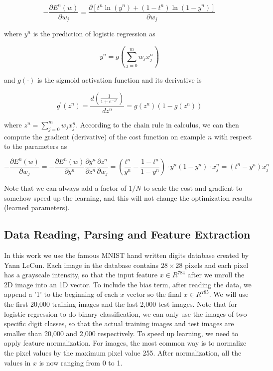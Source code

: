 \documentclass{article} %
\begin{document}
\begin{equation}
	-\frac{\partial E^{n}(w)}{\partial w_{j}} = \frac{\partial [t^{n}\ln(y^{n})+(1-t^{n})\ln(1-y^{n})]}{\partial w_{j}} 
\end{equation}

where $y^{n}$ is the prediction of logistic regression as

\begin{equation}
	y^{n} = g(\sum_{j=0}^{m}w_{j}x_{j}^{n})
\end{equation}

and $g(\cdot)$ is the sigmoid activation function and its derivative is

\begin{equation}
	g^{\prime}(z^{n}) = \frac{d(\frac{1}{1+e^{-z^{n}}})}{dz^{n}} = g(z^{n})(1-g(z^{n}))
\end{equation}

where $z ^{n}= \sum_{j=0}^{m}w_{j}x_{j}^{n}$. According to the chain rule in calculus, we can then compute the gradient (derivative) of the cost function on example $n$ with respect to the parameters as

\begin{equation}
	-\frac{\partial E^{n}(w)}{\partial w_{j}} = -\frac{\partial E^{n}(w)}{\partial y^{n}}\frac{\partial y^{n}}{\partial z^{n}}\frac{\partial z^{n}}{\partial w_{j}} = (\frac{t^{n}}{y^{n}}-\frac{1-t^{n}}{1-y^{n}})\cdot y^{n}(1-y^{n})\cdot x_{j}^{n} = (t^{n}-y^{n})x_{j}^{n}
\end{equation}

Note that we can always add a factor of $1/N$ to scale the cost and gradient to somehow speed up the learning, and this will not change the optimization results (learned parameters).

\subsection{Data Reading, Parsing and Feature Extraction} 
In this work we use the famous MNIST hand written digits database created by Yann LeCun. Each image in the database contains $28 \times 28$ pixels and each pixel has a grayscale intensity, so that the input feature $x \in R^{784}$ after we unroll the 2D image into an 1D vector. To include the bias term, after reading the data, we append a '1' to the beginning of each $x$ vector so the final $x \in R^{785}$. We will use the first 20,000 training images and the last 2,000 test images. Note that for logistic regression to do binary classification, we can only use the images of two specific digit classes, so that the actual training images and test images are smaller than 20,000 and 2,000 respectively. To speed up learning, we need to apply feature normalization. For images, the most common way is to normalize the pixel values by the maximum pixel value 255. After normalization, all the values in $x$ is now ranging from 0 to 1.
\end{document}
